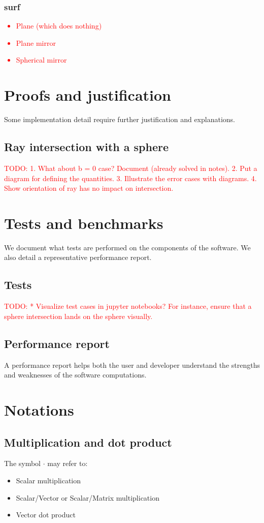 \subsubsection{surf}
\textcolor{red}{
\begin{itemize}
\item Plane (which does nothing)
\item Plane mirror
\item Spherical mirror
\end{itemize}}

\section{Proofs and justification}
Some implementation detail require further justification and explanations.

\subsection{Ray intersection with a sphere}
\textcolor{red}{TODO:
1. What about b = 0 case? Document (already solved in notes).
2. Put a diagram for defining the quantities.
3. Illustrate the error cases with diagrams.
4. Show orientation of ray has no impact on intersection.}

\section{Tests and benchmarks}
We document what tests are performed on the components of the software.
We also detail a representative performance report.

\subsection{Tests}
\textcolor{red}{TODO:
* Visualize test cases in jupyter notebooks? For instance, ensure that
  a sphere intersection lands on the sphere visually.}

\subsection{Performance report}
A performance report helps both the user and developer understand the strengths
and weaknesses of the software computations.

\section{Notations}
\subsection{Multiplication and dot product}
The symbol $\cdot$ may refer to:
\begin{itemize}
\item Scalar multiplication
\item Scalar/Vector or Scalar/Matrix multiplication
\item Vector dot product
\end{itemize}


